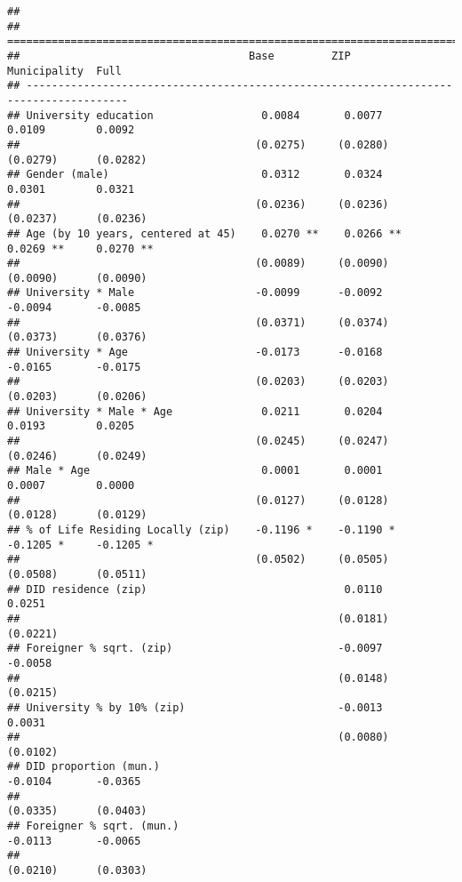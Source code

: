 \documentclass[
]{article}
\begin{document}
\begin{verbatim}
## 
## ======================================================================================
##                                    Base         ZIP          Municipality  Full       
## --------------------------------------------------------------------------------------
## University education                 0.0084       0.0077       0.0109        0.0092   
##                                     (0.0275)     (0.0280)     (0.0279)      (0.0282)  
## Gender (male)                        0.0312       0.0324       0.0301        0.0321   
##                                     (0.0236)     (0.0236)     (0.0237)      (0.0236)  
## Age (by 10 years, centered at 45)    0.0270 **    0.0266 **    0.0269 **     0.0270 **
##                                     (0.0089)     (0.0090)     (0.0090)      (0.0090)  
## University * Male                   -0.0099      -0.0092      -0.0094       -0.0085   
##                                     (0.0371)     (0.0374)     (0.0373)      (0.0376)  
## University * Age                    -0.0173      -0.0168      -0.0165       -0.0175   
##                                     (0.0203)     (0.0203)     (0.0203)      (0.0206)  
## University * Male * Age              0.0211       0.0204       0.0193        0.0205   
##                                     (0.0245)     (0.0247)     (0.0246)      (0.0249)  
## Male * Age                           0.0001       0.0001       0.0007        0.0000   
##                                     (0.0127)     (0.0128)     (0.0128)      (0.0129)  
## % of Life Residing Locally (zip)    -0.1196 *    -0.1190 *    -0.1205 *     -0.1205 * 
##                                     (0.0502)     (0.0505)     (0.0508)      (0.0511)  
## DID residence (zip)                               0.0110                     0.0251   
##                                                  (0.0181)                   (0.0221)  
## Foreigner % sqrt. (zip)                          -0.0097                    -0.0058   
##                                                  (0.0148)                   (0.0215)  
## University % by 10% (zip)                        -0.0013                     0.0031   
##                                                  (0.0080)                   (0.0102)  
## DID proportion (mun.)                                         -0.0104       -0.0365   
##                                                               (0.0335)      (0.0403)  
## Foreigner % sqrt. (mun.)                                      -0.0113       -0.0065   
##                                                               (0.0210)      (0.0303)  

\end{verbatim}
\end{document}
